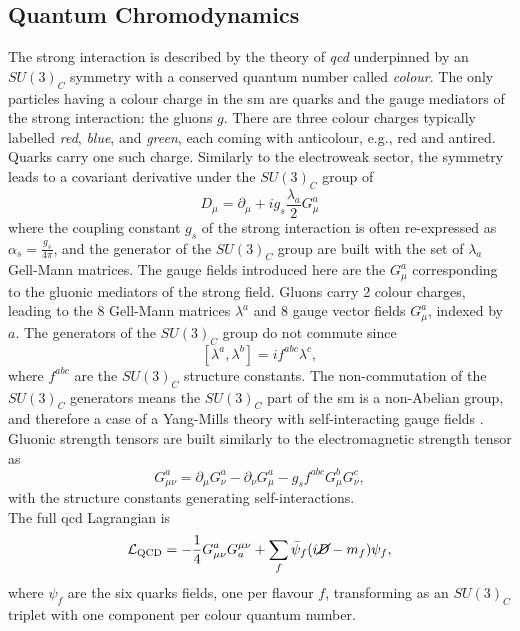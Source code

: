 \subsection{Quantum Chromodynamics}
The strong interaction is described by the theory of \textit{\gls{qcd}} underpinned by an $SU(3)_C$ symmetry with a conserved quantum number called \textit{colour}. The only particles having a colour charge in the \gls{sm} are quarks and the gauge mediators of the strong interaction: the gluons $g$. There are three colour charges typically labelled \textit{red}, \textit{blue}, and \textit{green}, each coming with anticolour, e.g., red and antired. Quarks carry one such charge. Similarly to the electroweak sector, the symmetry leads to a covariant derivative under the $SU(3)_C$ group of
\begin{equation}\label{eq-GaugeQCD}
    D_{\mu}  = \partial_{\mu} + ig_s \frac{\lambda_a}{2} G_{\mu}^a
\end{equation}
where the coupling constant $g_s$ of the strong interaction is often re-expressed as $\alpha_s = \frac{g_s}{4\pi}$, and the generator of the $SU(3)_C$ group are built with the set of $\lambda_a$ Gell-Mann matrices. The gauge fields introduced here are the $G_{\mu}^a$ corresponding to the gluonic mediators of the strong field. Gluons carry 2 colour charges, leading to the 8 Gell-Mann matrices $\lambda^a$ and 8 gauge vector fields $G_{\mu}^a$, indexed by $a$. The generators of the $SU(3)_C$ group do not commute since \[ [\lambda^a, \lambda^b] = i f^{abc} \lambda^c,\] where $f^{abc}$ are the $SU(3)_C$ structure constants. The non-commutation of the $SU(3)_C$ generators means the $SU(3)_C$ part of the \gls{sm} is a non-Abelian group, and therefore a case of a Yang-Mills theory with self-interacting gauge fields \cite{PhysRev.96.191}. Gluonic strength tensors are built similarly to the electromagnetic strength tensor as \[G_{\mu\nu}^a = \partial_{\mu} G_{\nu}^a   - \partial_{\nu} G_{\mu}^a - g_s f^{abc} G_{\mu}^b G_{\nu}^c,\] with the structure constants generating self-interactions. \\

The full \gls{qcd} Lagrangian is
\begin{equation}\label{eq-QCDLag}
    \mathcal{L}_{\text{QCD}} = -\frac{1}{4} G_{\mu\nu}^a G^{\mu\nu}_a + \sum_{f} \bar{\psi}_f (i \cancel{D} - m_f) \psi_f,
\end{equation}
where $\psi_f$ are the six quarks fields, one per flavour $f$, transforming as an $SU(3)_C$ triplet with one component per colour quantum number. \\


